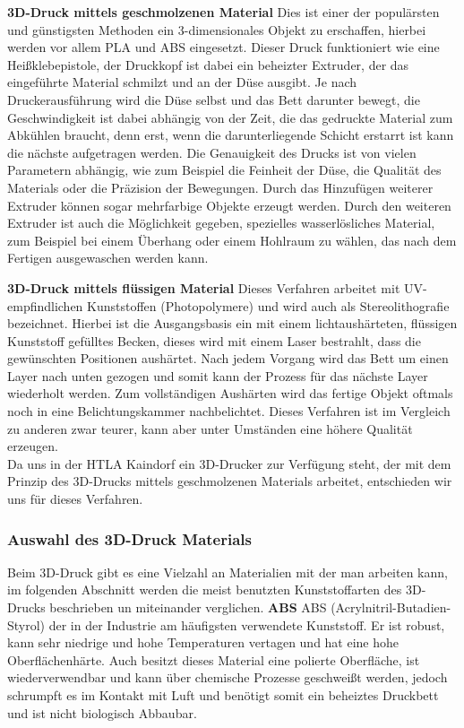 \textbf{3D-Druck mittels geschmolzenen Material}
Dies ist einer der populärsten und günstigsten Methoden ein 3-dimensionales Objekt zu erschaffen, hierbei werden vor allem PLA und
ABS eingesetzt. Dieser Druck funktioniert wie eine Heißklebepistole, der Druckkopf ist dabei ein beheizter Extruder, der
das eingeführte Material schmilzt und an der Düse ausgibt. Je nach Druckerausführung wird die Düse selbst und das Bett
darunter bewegt, die Geschwindigkeit ist dabei abhängig von der Zeit, die das gedruckte Material zum Abkühlen braucht,
denn erst, wenn die darunterliegende Schicht erstarrt ist kann die nächste aufgetragen werden. Die Genauigkeit des Drucks
ist von vielen Parametern abhängig, wie zum Beispiel die Feinheit der Düse, die Qualität des Materials oder die Präzision
der Bewegungen. Durch das Hinzufügen weiterer Extruder können sogar mehrfarbige Objekte erzeugt werden. Durch den
weiteren Extruder ist auch die Möglichkeit gegeben, spezielles wasserlösliches Material, zum Beispiel bei einem Überhang
oder einem Hohlraum zu wählen, das nach dem Fertigen ausgewaschen werden kann.

\textbf{3D-Druck mittels flüssigen Material}
Dieses Verfahren arbeitet mit UV-empfindlichen Kunststoffen (Photopolymere) und wird auch als Stereolithografie bezeichnet.
Hierbei ist die Ausgangsbasis ein mit einem lichtaushärteten, flüssigen Kunststoff gefülltes Becken, dieses wird mit
einem Laser bestrahlt, dass die gewünschten Positionen aushärtet. Nach jedem Vorgang wird das Bett um einen Layer nach
unten gezogen und somit kann der Prozess für das nächste Layer wiederholt werden. Zum vollständigen Aushärten wird
das fertige Objekt oftmals noch in eine Belichtungskammer nachbelichtet. Dieses Verfahren ist im Vergleich zu anderen
zwar teurer, kann aber unter Umständen eine höhere Qualität erzeugen. \\

Da uns in der HTLA Kaindorf ein 3D-Drucker zur Verfügung steht, der mit dem Prinzip des 3D-Drucks mittels geschmolzenen Materials
arbeitet, entschieden wir uns für dieses Verfahren.

\subsubsection{Auswahl des 3D-Druck Materials}
 Beim 3D-Druck gibt es eine Vielzahl an Materialien mit der man arbeiten kann, im folgenden Abschnitt werden die
meist benutzten Kunststoffarten des 3D-Drucks beschrieben un miteinander verglichen.
\textbf{ABS}
ABS (Acrylnitril-Butadien-Styrol) der in der Industrie am häufigsten verwendete Kunststoff. Er ist robust, kann sehr
niedrige und hohe Temperaturen vertagen und hat eine hohe Oberflächenhärte. Auch besitzt dieses Material eine polierte Oberfläche,
ist wiederverwendbar und kann über chemische Prozesse geschweißt werden, jedoch schrumpft es im Kontakt mit Luft und benötigt somit ein beheiztes Druckbett und ist
nicht biologisch Abbaubar.


